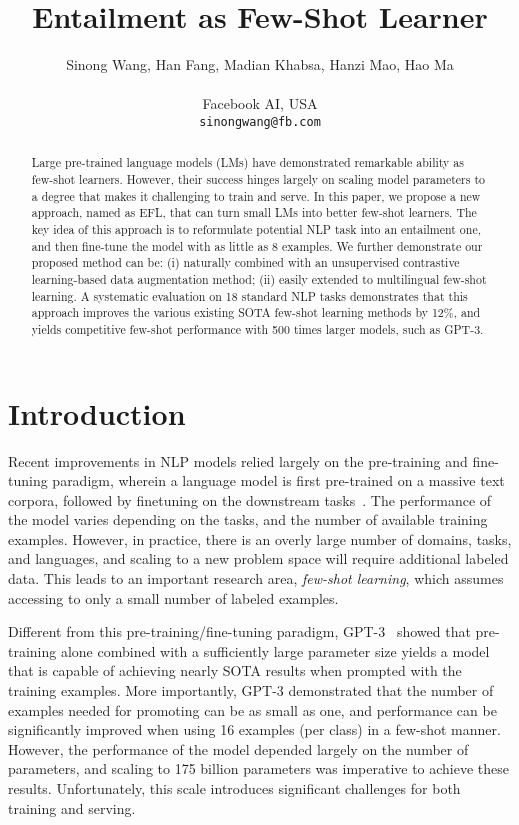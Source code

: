 \documentclass{article}
\title{Entailment as Few-Shot Learner}
\author{Sinong Wang, Han Fang, Madian Khabsa, Hanzi Mao, Hao Ma\\\\
  Facebook AI, USA\\
 \texttt{sinongwang@fb.com}\\
}
\begin{document}
\maketitle

\begin{abstract}
Large pre-trained language models (LMs) have demonstrated remarkable ability as few-shot learners. However, their success hinges largely on scaling model parameters to a degree that makes it challenging to train and serve. In this paper, we propose a new approach, named as EFL, that can turn small LMs into better few-shot learners. The key idea of this approach is to reformulate potential NLP task into an entailment one, and then fine-tune the model with as little as 8 examples. We further demonstrate our proposed method can be: (i) naturally combined with an unsupervised contrastive learning-based data augmentation method; (ii) easily extended to multilingual few-shot learning. A systematic evaluation on 18 standard NLP tasks demonstrates that this approach improves the various existing SOTA few-shot learning methods by 12\%, and yields competitive few-shot performance with 500 times larger models, such as GPT-3.





\end{abstract}

\section{Introduction}

Recent improvements in NLP models relied largely on the pre-training and fine-tuning paradigm, wherein a language model is first pre-trained on a massive text corpora, followed by finetuning on the downstream tasks~\citep{devlin2019bert,liu2019roberta,raffel2020exploring,lewis2020bart}. The performance of the model varies depending on the tasks, and the number of available training examples. However, in practice, there is an overly large number of domains, tasks, and languages, and scaling to a new problem space will require additional labeled data. This leads to an important research area, \textit{few-shot learning}, which assumes accessing to only a small number of labeled examples.

Different from this pre-training/fine-tuning paradigm, GPT-3~\citep{brown2020language} showed that pre-training alone combined with a sufficiently large parameter size yields a model that is capable of achieving nearly SOTA results when prompted with the training examples. More importantly, GPT-3 demonstrated that the number of examples needed for promoting can be as small as one, and performance can be significantly improved when using 16 examples (per class) in a few-shot manner. However, the performance of the model depended largely on the number of parameters, and scaling to 175 billion parameters was imperative to achieve these results. Unfortunately, this scale introduces significant challenges for both training and serving.
\end{document}
